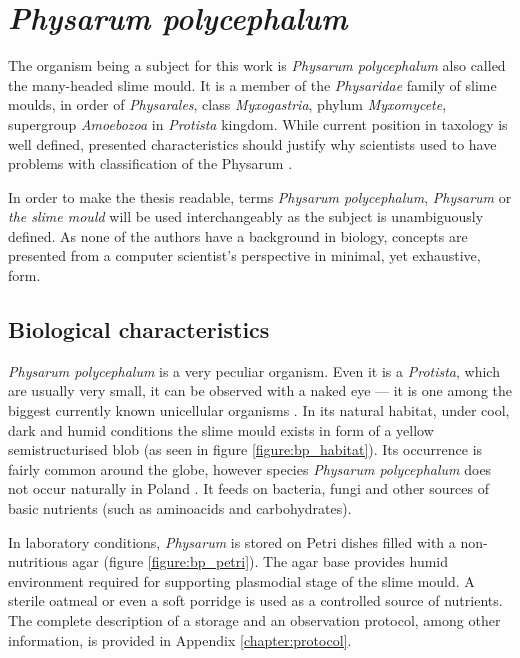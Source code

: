 \section{\textit{Physarum polycephalum}}
\label{section:background_physarum}

The organism being a subject for this work is \textit{Physarum polycephalum} also called the many-headed slime mould. It is a member of the \textit{Physaridae} family of slime moulds, in order of \textit{Physarales}, class \textit{Myxogastria}, phylum \textit{Myxomycete}, supergroup \textit{Amoebozoa} in \textit{Protista} kingdom. While current position in taxology is well defined, presented characteristics should justify why scientists used to have problems with classification of the Physarum \cite{stephenson1994myxomycetes}.

In order to make the thesis readable, terms \textit{Physarum polycephalum}, \textit{Physarum} or \textit{the slime mould} will be used interchangeably as the subject is unambiguously defined. As none of the authors have a background in biology, concepts are presented from a computer scientist's perspective in minimal, yet exhaustive, form.


\subsection{Biological characteristics}

\textit{Physarum polycephalum} is a very peculiar organism. Even it is a \textit{Protista}, which are usually very small, it can be observed with a naked eye --- it is one among the biggest currently known unicellular organisms \cite{stephenson1994myxomycetes}. In its natural habitat, under cool, dark and humid conditions the slime mould exists in form of a yellow semistructurised blob (as seen in figure \ref{figure:bp_habitat}). Its occurrence is fairly common around the globe, however species \textit{Physarum polycephalum} does not occur naturally in Poland \cite{narkiewicz2013grzyby}. It feeds on bacteria, fungi and other sources of basic nutrients (such as aminoacids and carbohydrates).

In laboratory conditions, \textit{Physarum} is stored on Petri dishes filled with a non-nutritious agar (figure \ref{figure:bp_petri}). The agar base provides humid environment required for supporting plasmodial stage of the slime mould. A sterile oatmeal or even a soft porridge is used as a controlled source of nutrients. The complete description of a storage and an observation protocol, among other information, is provided in Appendix \ref{chapter:protocol}.


